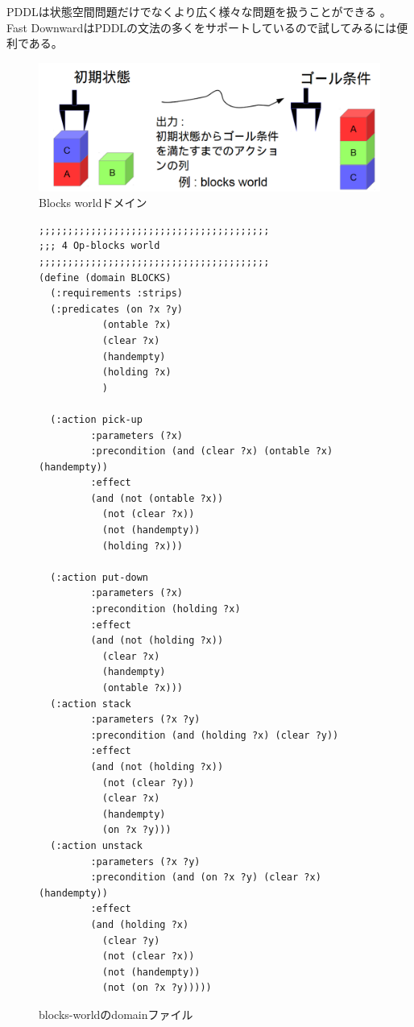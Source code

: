 PDDLは状態空間問題だけでなくより広く様々な問題を扱うことができる \cite{aeronautiques1998pddl,fox2003pddl2}。
Fast DownwardはPDDLの文法の多くをサポートしているので試してみるには便利である。

\begin{figure}
\includegraphics[width=0.8\linewidth]{./figures/blocks-image.png}
\caption{Blocks worldドメイン}
\label{fig:sliding-token}
\end{figure}

\begin{figure}
\lstset{language=pddl,basicstyle=\ttfamily\footnotesize,breaklines=true}
\begin{lstlisting}
;;;;;;;;;;;;;;;;;;;;;;;;;;;;;;;;;;;;;;;;
;;; 4 Op-blocks world
;;;;;;;;;;;;;;;;;;;;;;;;;;;;;;;;;;;;;;;;
(define (domain BLOCKS)
  (:requirements :strips)
  (:predicates (on ?x ?y)
	       (ontable ?x)
	       (clear ?x)
	       (handempty)
	       (holding ?x)
	       )

  (:action pick-up
	     :parameters (?x)
	     :precondition (and (clear ?x) (ontable ?x) (handempty))
	     :effect
	     (and (not (ontable ?x))
		   (not (clear ?x))
		   (not (handempty))
		   (holding ?x)))

  (:action put-down
	     :parameters (?x)
	     :precondition (holding ?x)
	     :effect
	     (and (not (holding ?x))
		   (clear ?x)
		   (handempty)
		   (ontable ?x)))
  (:action stack
	     :parameters (?x ?y)
	     :precondition (and (holding ?x) (clear ?y))
	     :effect
	     (and (not (holding ?x))
		   (not (clear ?y))
		   (clear ?x)
		   (handempty)
		   (on ?x ?y)))
  (:action unstack
	     :parameters (?x ?y)
	     :precondition (and (on ?x ?y) (clear ?x) (handempty))
	     :effect
	     (and (holding ?x)
		   (clear ?y)
		   (not (clear ?x))
		   (not (handempty))
		   (not (on ?x ?y)))))
\end{lstlisting}
\caption{blocks-worldのdomainファイル}
\label{fig:pddl-domain}
\end{figure}

